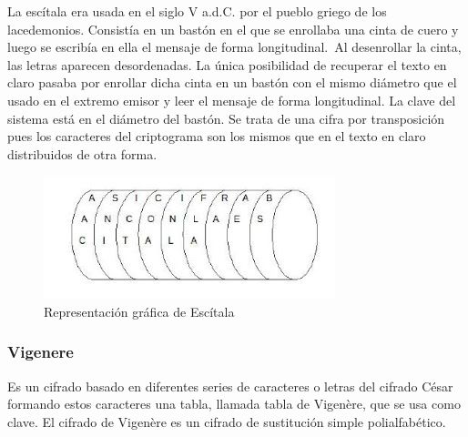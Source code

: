 \documentclass[11pt, conference]{IEEEtran}
\begin{document}
La escítala era usada en el siglo V a.d.C. por el pueblo griego de los lacedemonios. Consistía en un bastón en el que se enrollaba una cinta de cuero y luego se escribía en ella el mensaje de forma longitudinal. Al desenrollar la cinta, las letras aparecen desordenadas. La única posibilidad de recuperar el texto en claro pasaba por enrollar dicha cinta en un bastón con el mismo diámetro que el usado en el extremo emisor y leer el mensaje de forma longitudinal. La clave del sistema está en el diámetro del bastón. Se trata de una cifra por transposición pues los caracteres del criptograma son los mismos que en el texto en claro distribuidos de otra forma.


\begin{figure}[h]
	\begin{center}
		\includegraphics[scale=0.7]{3.jpg}
		\caption{Representación gráfica de Escítala} 
	\end{center}
\end{figure}


\subsubsection{Vigenere}
Es un cifrado basado en diferentes series de caracteres o letras del cifrado César formando estos caracteres una tabla, llamada tabla de Vigenère, que se usa como clave. El cifrado de Vigenère es un cifrado de sustitución simple polialfabético.
\end{document}
